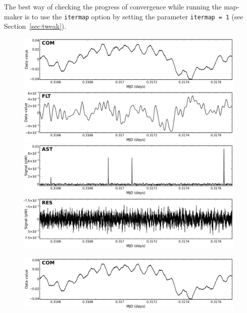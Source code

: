 \documentclass[twoside,11pt]{article}
\newcommand{\htmlref}[2]{#1}
\newenvironment{latexonly}{}{}
\newcommand{\latexhtml}[2]{#1}
\renewcommand{\_}{\texttt{\symbol{95}}}
\newcommand{\param}[1]{\texttt{#1}}
\newcommand{\cref}[3]{\latexhtml{#1~\ref{#2}}{\htmlref{#3}{#2}}}
\begin{document}
The best way of checking the progress of convergence while running the
map-maker is to use the \param{itermap} option by setting the parameter
\param{itermap~=~1} (see \cref{Section}{sec:tweak}{Tweaking the
Configuration File}).

\begin{figure}
\begin{center}
\begin{latexonly}
  \includegraphics[width=\linewidth]{sc21_com} \\
  \includegraphics[width=\linewidth]{sc21_flt} \\
  \includegraphics[width=\linewidth]{sc21_ast} \\
  \includegraphics[width=\linewidth]{sc21_res} \\
\end{latexonly}
\begin{htmlonly}
  \includegraphics[width=136mm]{sc21_com} \\

\end{htmlonly}
\end{center}
\end{figure}
\end{document}
